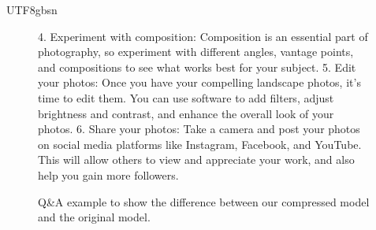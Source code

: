 \documentclass{article}
\theoremstyle{plain}
\theoremstyle{definition}
\theoremstyle{remark}
\begin{document}
\begin{CJK}{UTF8}{gbsn}
\begin{figure}[t]
\begin{center}
\begin{tcolorbox}[colback=gray!10,%
			colframe=black,%
			width=16cm,%
			arc=1mm, auto outer arc,
			boxrule=0.8pt,
			]
			4. Experiment with composition: Composition is an essential part of photography, so experiment with different angles, vantage points, and compositions to see what works best for your subject.
			5. Edit your photos: Once you have your compelling landscape photos, it's time to edit them. You can use software to add filters, adjust brightness and contrast, and enhance the overall look of your photos.
			6. Share your photos: Take a camera and post your photos on social media platforms like Instagram, Facebook, and YouTube. This will allow others to view and appreciate your work, and also help you gain more followers.
		\end{tcolorbox}
	\end{center}
	\vspace{-12pt}
	\caption{Q\&A example to show the difference between our compressed model and the original model.}
	\label{fig:visualize3}
\end{figure}



\end{CJK}
\end{document}
